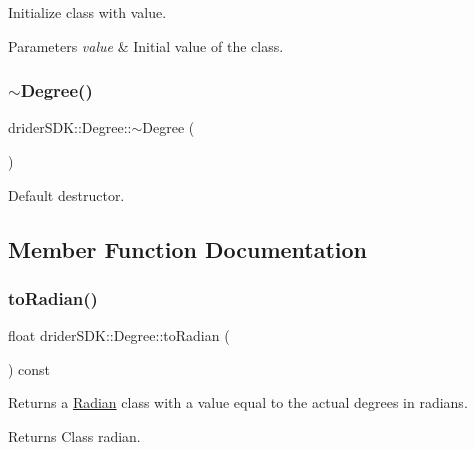 Initialize class with value.


\begin{DoxyParams}{Parameters}
{\em value} & Initial value of the class. \\
\hline
\end{DoxyParams}
\mbox{\label{classdrider_s_d_k_1_1_degree_a44a8904fbd4178de2916c2b54883c1e1}} 
\subsubsection{\texorpdfstring{$\sim$\+Degree()}{~Degree()}}
{\footnotesize\ttfamily drider\+S\+D\+K\+::\+Degree\+::$\sim$\+Degree (\begin{DoxyParamCaption}{ }\end{DoxyParamCaption})}

Default destructor. 

\subsection{Member Function Documentation}
\mbox{\label{classdrider_s_d_k_1_1_degree_a5904a76d6c28c10ca432ee46db1997a8}} 
\subsubsection{\texorpdfstring{to\+Radian()}{toRadian()}}
{\footnotesize\ttfamily float drider\+S\+D\+K\+::\+Degree\+::to\+Radian (\begin{DoxyParamCaption}{ }\end{DoxyParamCaption}) const}

Returns a \hyperlink{classdrider_s_d_k_1_1_radian}{Radian} class with a value equal to the actual degrees in radians.

\begin{DoxyReturn}{Returns}
Class radian. 
\end{DoxyReturn}
\mbox{\label{classdrider_s_d_k_1_1_degree_a1dedd27ddf700baf9c6f706888e81d0a}} 

